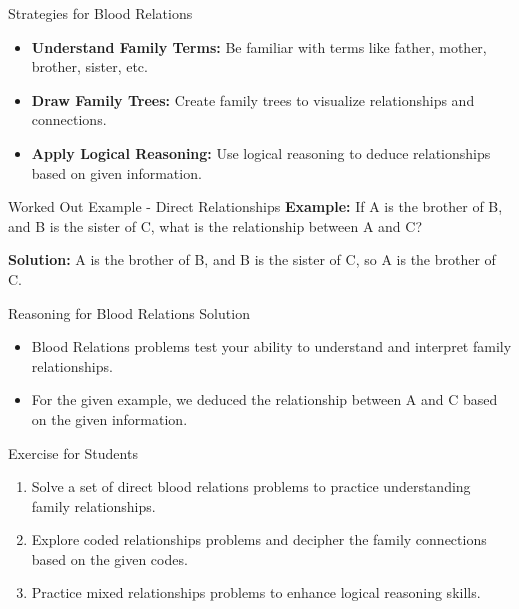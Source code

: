 \begin{frame}{Strategies for Blood Relations}
  \begin{itemize}
    \item \textbf{Understand Family Terms:} Be familiar with terms like father, mother, brother, sister, etc.
    \item \textbf{Draw Family Trees:} Create family trees to visualize relationships and connections.
    \item \textbf{Apply Logical Reasoning:} Use logical reasoning to deduce relationships based on given information.
  \end{itemize}
\end{frame}

\begin{frame}{Worked Out Example - Direct Relationships}
  \textbf{Example:} If A is the brother of B, and B is the sister of C, what is the relationship between A and C?

  \textbf{Solution:} A is the brother of B, and B is the sister of C, so A is the brother of C.
\end{frame}

\begin{frame}{Reasoning for Blood Relations Solution}
  \begin{itemize}
    \item Blood Relations problems test your ability to understand and interpret family relationships.
    \item For the given example, we deduced the relationship between A and C based on the given information.
  \end{itemize}
\end{frame}

\begin{frame}{Exercise for Students}
  \begin{enumerate}
    \item Solve a set of direct blood relations problems to practice understanding family relationships.
    \item Explore coded relationships problems and decipher the family connections based on the given codes.
    \item Practice mixed relationships problems to enhance logical reasoning skills.
  \end{enumerate}
\end{frame}
